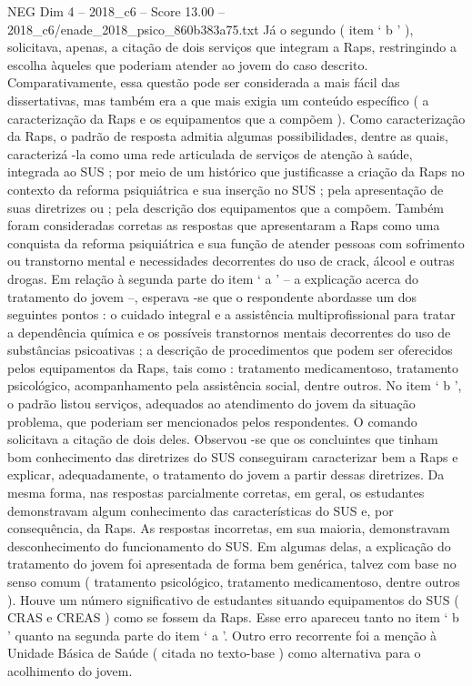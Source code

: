 \begin{textsample}{NEG Dim 4 – 2018\_c6 – Score 13.00 – 2018\_c6/enade\_2018\_psico\_860b383a75.txt}
Já o segundo ( item ‘ b ’ ), solicitava, apenas, a citação de dois serviços que integram a Raps, restringindo a escolha àqueles que poderiam atender ao jovem do caso descrito.
Comparativamente, essa questão pode ser considerada a mais fácil das dissertativas, mas também era a que mais exigia um conteúdo específico ( a caracterização da Raps e os equipamentos que a compõem ).
Como caracterização da Raps, o padrão de resposta admitia algumas possibilidades, dentre as quais, caracterizá -la como uma rede articulada de serviços de atenção à saúde, integrada ao SUS ; por meio de um histórico que justificasse a criação da Raps no contexto da reforma psiquiátrica e sua inserção no SUS ; pela apresentação de suas diretrizes ou ; pela descrição dos equipamentos que a compõem.
Também foram consideradas corretas as respostas que apresentaram a Raps como uma conquista da reforma psiquiátrica e sua função de atender pessoas com sofrimento ou transtorno mental e necessidades decorrentes do uso de crack, álcool e outras drogas.
Em relação à segunda parte do item ‘ a ’ – a explicação acerca do tratamento do jovem –, esperava -se que o respondente abordasse um dos seguintes pontos : o cuidado integral e a assistência multiprofissional para tratar a dependência química e os possíveis transtornos mentais decorrentes do uso de substâncias psicoativas ; a descrição de procedimentos que podem ser oferecidos pelos equipamentos da Raps, tais como : tratamento medicamentoso, tratamento psicológico, acompanhamento pela assistência social, dentre outros.
No item ‘ b ’, o padrão listou serviços, adequados ao atendimento do jovem da situação problema, que poderiam ser mencionados pelos respondentes.
O comando solicitava a citação de dois deles.
Observou -se que os concluintes que tinham bom conhecimento das diretrizes do SUS conseguiram caracterizar bem a Raps e explicar, adequadamente, o tratamento do jovem a partir dessas diretrizes.
Da mesma forma, nas respostas parcialmente corretas, em geral, os estudantes demonstravam algum conhecimento das características do SUS e, por consequência, da Raps.
As respostas incorretas, em sua maioria, demonstravam desconhecimento do funcionamento do SUS.
Em algumas delas, a explicação do tratamento do jovem foi apresentada de forma bem genérica, talvez com base no senso comum ( tratamento psicológico, tratamento medicamentoso, dentre outros ).
Houve um número significativo de estudantes situando equipamentos do SUS ( CRAS e CREAS ) como se fossem da Raps.
Esse erro apareceu tanto no item ‘ b ’ quanto na segunda parte do item ‘ a ’.
Outro erro recorrente foi a menção à Unidade Básica de Saúde ( citada no texto-base ) como alternativa para o acolhimento do jovem.

\end{textsample}
